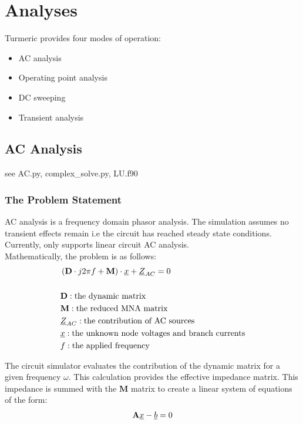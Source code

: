 \section{Analyses}

Turmeric provides four modes of operation:

\begin{itemize}
    \item AC analysis
    \item Operating point analysis
    \item DC sweeping
    \item Transient analysis
\end{itemize}

\subsection{AC Analysis}

see AC.py, complex\_solve.py, LU.f90

\subsubsection{The Problem Statement}
AC analysis is a frequency domain phasor analysis. The simulation assumes no transient effects remain i.e the circuit has reached steady state conditions. Currently, \turmeric only supports linear circuit AC analysis.\\

Mathematically, the problem is as follows:
\begin{align*}
    &\left(\mathbf{D}\cdot j 2\pi f + \mathbf{M}\right)\cdot \underline{x} + \underline{Z}_{AC} = 0\label{eq:ac problem}\\\\
    &\mathbf{D}: \text{the dynamic matrix}\\
    &\mathbf{M}: \text{the reduced MNA matrix}\\
    &\underline{Z}_{AC}: \text{the contribution of AC sources}\\
    &\underline{x}: \text{the unknown node voltages and branch currents}\\
    &f: \text{the applied frequency}
\end{align*}

The circuit simulator evaluates the contribution of the dynamic matrix for a given frequency $\omega$. This calculation provides the effective impedance matrix. This impedance is summed with the $\mathbf{M}$ matrix to create a linear system of equations of the form:
\begin{align*}
    \mathbf{A}\underline{x} - \underline{b} = 0 
\end{align*}
